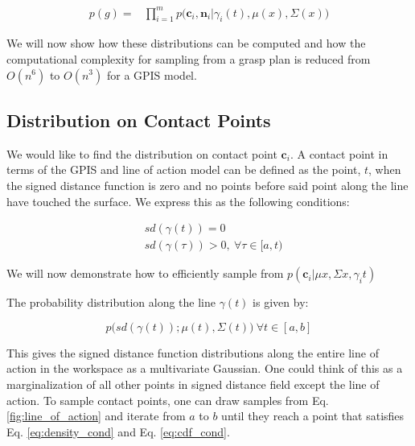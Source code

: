 \documentclass[letterpaper, 10 pt, conference]{ieeeconf}  %
\begin{document}
\vspace{-2ex}
\begin{align}\label{eq:independence}
p(g) = &\prod_{i=1}^mp\big(\textbf{c}_i,\textbf{n}_i|\gamma_i(t),\mu(x),\Sigma(x)\big)
\end{align}


We will now show how these distributions can be computed and how the computational complexity for sampling from a grasp plan is reduced from $O(n^6)$ to $O(n^3)$ for a GPIS model. 


\subsection{Distribution on Contact Points}\label{sec:contact} 
We would like to find the distribution on contact point $\textbf{c}_i$. A contact point in terms of the GPIS and line of action model can be defined as the point, $t$, when the signed distance function is zero and no points before said point along the line have touched the surface. We express this as the following conditions: 

\vspace{-2ex}
\begin{align}
 &sd(\gamma(t)) = 0 \label{eq:density_cond} \\
&sd(\gamma(\tau)) > 0, \: \forall \tau \in [a,t) \label{eq:cdf_cond}
\end{align}

We will now demonstrate how to efficiently sample from $p(\textbf{c}_i|\mu{x},\Sigma{x},\gamma_i{t})$

The probability distribution along the line $\gamma(t)$ is given by:

\vspace{-2ex}
\begin{equation} \label{eq:line_of_act_dist}
p\big(sd(\gamma(t)) ; \mu(t),\Sigma(t)\big) \ \forall t \in [a,b] 
\end{equation}

This gives the signed distance function distributions along the entire line of action in the workspace as a multivariate Gaussian. One could think of this as a marginalization of all other points in signed distance field except the line of action. To sample contact points, one can draw samples from Eq. \ref{fig:line_of_action} and iterate from $a$ to $b$ until they reach a point that satisfies  Eq. \ref{eq:density_cond} and Eq. \ref{eq:cdf_cond}. 
\end{document}
